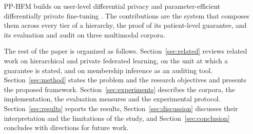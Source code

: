 PP-HFM builds on user-level differential privacy \cite{ref11} and
parameter-efficient differentially private fine-tuning \cite{ref12, ref13}.
The contributions are the system that composes them across every tier of a
hierarchy, the proof of its patient-level guarantee, and its evaluation and
audit on three multimodal corpora.

The rest of the paper is organized as follows. Section~\ref{sec:related}
reviews related work on hierarchical and private federated learning, on the
unit at which a guarantee is stated, and on membership inference as an
auditing tool. Section~\ref{sec:method} states the problem and the research
objectives and presents the proposed framework.
Section~\ref{sec:experiments} describes the corpora, the implementation, the
evaluation measures and the experimental protocol. Section~\ref{sec:results}
reports the results, Section~\ref{sec:discussion} discusses their
interpretation and the limitations of the study, and
Section~\ref{sec:conclusion} concludes with directions for future work.
